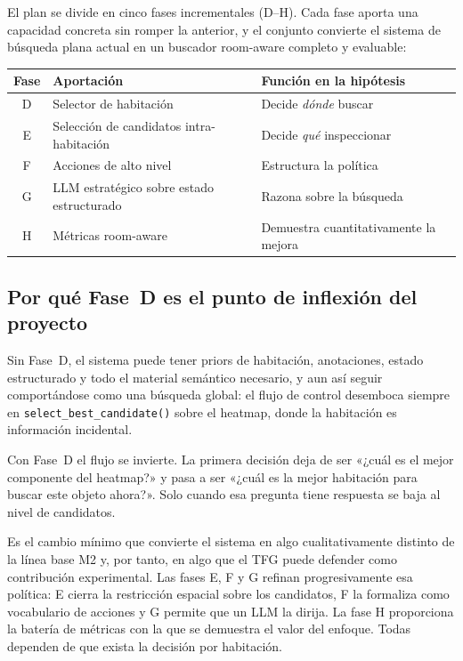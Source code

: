\documentclass[11pt,a4paper]{article}
\begin{document}
El plan se divide en cinco fases incrementales (D--H). Cada fase aporta una
capacidad concreta sin romper la anterior, y el conjunto convierte el sistema
de búsqueda plana actual en un buscador room-aware completo y evaluable:

\begin{center}
\begin{tabular}{cp{8cm}l}
\toprule
\textbf{Fase} & \textbf{Aportación} & \textbf{Función en la hipótesis} \\
\midrule
D & Selector de habitación &
  Decide \emph{dónde} buscar \\
E & Selección de candidatos intra-habitación &
  Decide \emph{qué} inspeccionar \\
F & Acciones de alto nivel &
  Estructura la política \\
G & LLM estratégico sobre estado estructurado &
  Razona sobre la búsqueda \\
H & Métricas room-aware &
  Demuestra cuantitativamente la mejora \\
\bottomrule
\end{tabular}
\end{center}

\subsection{Por qué Fase~D es el punto de inflexión del proyecto}
\label{sec:fase-d-inflexion}

Sin Fase~D, el sistema puede tener priors de habitación, anotaciones, estado
estructurado y todo el material semántico necesario, y aun así seguir
comportándose como una búsqueda global: el flujo de control desemboca siempre
en \texttt{select\_best\_candidate()} sobre el heatmap, donde la habitación
es información incidental.

Con Fase~D el flujo se invierte. La primera decisión deja de ser «¿cuál es el
mejor componente del heatmap?» y pasa a ser «¿cuál es la mejor habitación
para buscar este objeto ahora?». Solo cuando esa pregunta tiene respuesta se
baja al nivel de candidatos.

Es el cambio mínimo que convierte el sistema en algo cualitativamente
distinto de la línea base M2 y, por tanto, en algo que el TFG puede defender
como contribución experimental. Las fases E, F y G refinan progresivamente
esa política: E cierra la restricción espacial sobre los candidatos, F la
formaliza como vocabulario de acciones y G permite que un LLM la dirija. La
fase H proporciona la batería de métricas con la que se demuestra el valor
del enfoque. Todas dependen de que exista la decisión por habitación.
\end{document}
